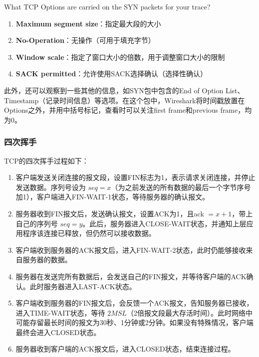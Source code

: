\documentclass{article}
\begin{document}
	\begin{tcolorbox}[title = {Question}, colback = red!25!white, colframe = red!75!black]
		What TCP Options are carried on the SYN packets for your trace?
	\end{tcolorbox}
	
	\begin{tcolorbox}[title = {Answer}, colback = blue!25!white, colframe = blue!75!black]
		\begin{enumerate}[noitemsep, label={{\arabic*})}]
			\item \textbf{Maximum segment size}：指定最大段的大小
			\item \textbf{No-Operation}：无操作（可用于填充字节）
			\item \textbf{Window scale}：指定了窗口大小的倍数，用于调整窗口大小的限制
			\item \textbf{SACK permitted}：允许使用SACK选择确认（选择性确认）
		\end{enumerate}\textbf{}
		
		此外，还可以观察到一些其他的信息，如SYN包中包含的End of Option List、Timestamp（记录时间信息）等选项。在这个包中，Wireshark将时间戳放置在Options之外，并用中括号标记，查看时可以关注first frame和previous frame，均为0。
		
	\end{tcolorbox}
	
	\subsubsection{四次挥手}
	
	TCP的四次挥手过程如下：
	
	\begin{enumerate}[noitemsep]
		\item 客户端发送关闭连接的报文段，设置FIN标志为1，表示请求关闭连接，并停止发送数据。序列号设为 $ seq = x $（为之前发送的所有数据的最后一个字节序号加1），客户端进入FIN-WAIT-1状态，等待服务器的确认报文。
		\item 服务器收到FIN报文后，发送确认报文，设置ACK为1，且ack $ = x + 1 $，带上自己的序列号 $ seq = y $。此后，服务器进入CLOSE-WAIT状态，并通知上层应用程序该连接已释放，但仍然可以接收数据。
		\item 客户端收到服务器的ACK报文后，进入FIN-WAIT-2状态，此时仍能够接收来自服务器的数据。
		\item 服务器在发送完所有数据后，会发送自己的FIN报文，并等待客户端的ACK确认。此时服务器进入LAST-ACK状态。
		\item 客户端收到服务器的FIN报文后，会反馈一个ACK报文，告知服务器已接收，进入TIME-WAIT状态，等待 $ 2MSL $（2倍报文段最大存活时间）。此时网络中可能存留最长时间的报文为30秒、1分钟或2分钟。如果没有特殊情况，客户端最终会进入CLOSED状态。
		\item 服务器收到客户端的ACK报文后，进入CLOSED状态，结束连接过程。
	\end{enumerate}
	
\end{document}
